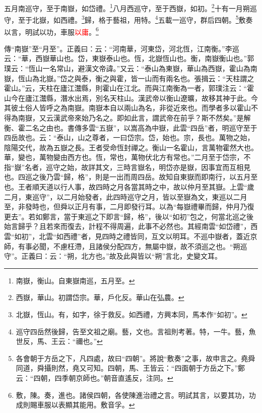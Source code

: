 五月南巡守，至于南嶽，如岱禮。\footnote{南嶽，衡山。自東嶽南巡，五月至。}八月西巡守，至于西嶽，如初。\footnote{西嶽，華山。初謂岱宗。華，戶化反。華山在弘農。}十有一月朔巡守，至于北嶽，如西禮。\footnote{北嶽，恆山。有，如字，徐于救反。如西禮，方興本同，馬本作“如初”。}歸，格于藝祖，用特。\footnote{巡守四岳然後歸，告至文祖之廟。藝，文也。言祖則考著。特，一牛。藝，魚世反，馬、王云：“禰也。”}五載一巡守，群后四朝。\footnote{各會朝于方岳之下，凡四處，故曰“四朝”。將說“敷奏”之事，故申言之。堯舜同道，舜攝則然，堯又可知。四朝，馬、王皆云：“四面朝于方岳之下。”鄭云：“四朝，四季朝京師也。”朝音直遙反，注同。}敷奏以言，明試以功，車服\textcolor{red}{以庸}。\footnote{敷，陳。奏，進也。諸侯四朝，各使陳進治禮之言。明試其言，以要其功，功成則賜車服以表顯其能用。敷音孚。}

{\noindent\zhuan{}\fzbyks 傳“南嶽”至“月至”。正義曰：云：“河南華，河東岱，河北恆，江南衡。”李巡云：“華，西嶽華山也。岱，東嶽泰山也。恆，北嶽恆山也。衡，南嶽衡山也。”郭璞云：“恆山一名常山，避漢文帝諱。”又云：“泰山為東嶽，華山為西嶽，霍山為南嶽，恆山為北嶽。”岱之與泰，衡之與霍，皆一山而有兩名也。張揖云：“天柱謂之霍山。”云，天柱在廬江灊縣，則霍山在江北。而與江南衡為一者，郭璞注云：“霍山今在廬江灊縣，潛水出焉，別名天柱山。漢武帝以衡山遼曠，故移其神于此。今其彼土俗人皆呼之為南嶽。南嶽本自以兩山為名，非從近來也。而學者多以霍山不得為南嶽，又云漢武帝來始乃名之。即如此言，謂武帝在前乎？斯不然矣。”是解衡、霍二名之由也。書傳多雲“五嶽”，以嵩高為中嶽，此雲“四岳”者，明巡守至于四岳故也。云：“泰山，山之尊者，一曰岱宗。岱，始也。宗，長也。萬物之始，陰陽交代，故為五嶽之長。王者受命恆封禪之。衡山一名霍山，言萬物霍然大也。華，變也，萬物變由西方也。恆，常也，萬物伏北方有常也。”二月至于岱宗，不指“嶽”名者，巡守之始，故詳其文，三時言嶽名，明岱亦是嶽，因事宜而互相見也。四巡之後乃雲“歸，格”，則是一出而周四岳。故知自東嶽而即南行，以五月至也。王者順天道以行人事，故四時之月各當其時之中，故以仲月至其嶽。上雲“歲二月，東巡守”，以二月始發者，此四時巡守之月，皆以至嶽為文，東巡以二月至，非發時也，但舜以正月有事，二月即發行耳。以為“每嶽禮畢而歸，仲月乃復更去”。若如鄭言，當于東巡之下即言“歸，格”，後以“如初”包之，何當北巡之後始言歸乎？且若來而復去，計程不得周遍，此事不必然也。其經南雲“如岱禮”，西雲“如初”，北雲“如西禮”者，見四時之禮皆同，互文以明耳。不巡中嶽者，蓋近京師，有事必聞，不慮枉滯，且諸侯分配四方，無屬中嶽，故不須巡之也。“朔巡守”。正義曰：云：“朔，北方也。”故及此與皆以“朔”言北，史變文耳。 \par}

